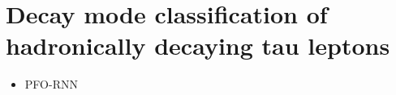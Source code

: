 \chapter{Decay mode classification of hadronically decaying tau leptons}
\label{sec:decaymode}

\begin{itemize}
\item PFO-RNN
\end{itemize}
